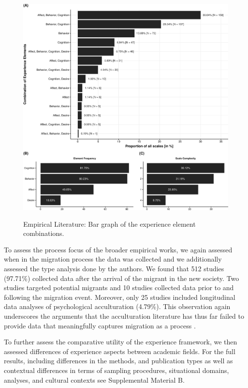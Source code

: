 \begin{figure}[h]
\centering
\caption{Empirical Literature: Bar graph of the experience element combinations.}
\includegraphics[width=\textwidth]{Figures/EmpPlotFreq-1}
\label{fig:EmpPlotFreq-1}
\end{figure}

To assess the process focus of the broader empirical works, we again
assessed when in the migration process the data was collected and we
additionally assessed the type analysis done by the authors. We found
that 512 studies (97.71\%) collected data after the arrival of the
migrant in the new society. Two studies targeted potential migrants and
10 studies collected data prior to and following the migration event.
Moreover, only 25 studies included longitudinal data analyses of
psychological acculturation (4.79\%). This observation again underscores
the arguments that the acculturation literature has thus far failed to
provide data that meaningfully captures migration as a process
\citep[e.g.,][]{Brown2011, Ward2019}.

To further assess the comparative utility of the experience framework,
we then assessed differences of experience aspects between academic
fields. For the full results, including differences in the methods, and
publication types as well as contextual differences in terms of sampling
procedures, situational domains, analyses, and cultural contexts see
Supplemental Material B.

